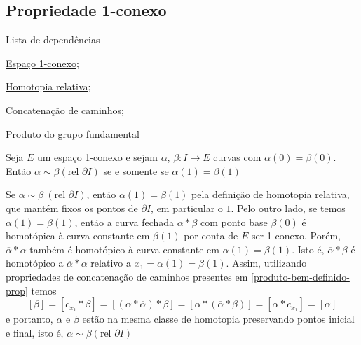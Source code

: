 \subsection{Propriedade 1-conexo} %
\label{1-conexo-prop}
\begin{titlemize}{Lista de dependências}
	\item \hyperref[espaço-1-conexo-def]{Espaço 1-conexo};\\ %
	\item \hyperref[homotopia-relativa-def]{Homotopia relativa};\\
        \item \hyperref[Produto-concatenacao-def]{Concatenação de caminhos};\\
        \item  \hyperref[produto-bem-definido-prop]{Produto do grupo fundamental}
\end{titlemize}




\begin{prop}%
	Seja $E$ um espaço 1-conexo e sejam $\alpha$, $\beta: I\rightarrow E$ curvas com $\alpha(0)=\beta(0)$. Então $\alpha \sim \beta (\text{rel }\partial I)$ se e somente se $\alpha(1)=\beta(1)$\\
\end{prop}
\begin{dem}
    Se $\alpha \sim \beta ~(\text{rel }\partial I)$, então $\alpha(1)=\beta(1)$ pela definição de homotopia relativa, que mantém fixos os pontos de $\partial I$, em particular o $1$.
    Pelo outro lado, se temos $\alpha(1)=\beta(1)$, então a curva fechada $\overline{\alpha}* \beta$ com ponto base $\beta(0)$ é homotópica à curva constante em $\beta(1)$ por conta de $E$ ser 1-conexo. Porém, $\overline{\alpha}*\alpha$ também é homotópico à curva constante em $\alpha(1)=\beta(1)$. Isto é, $\overline{\alpha}* \beta$ é homotópico a $\overline{\alpha}*\alpha$ relativo a $x_1=\alpha(1)=\beta(1)$. Assim, utilizando propriedades de concatenação de caminhos presentes em \ref{produto-bem-definido-prop} temos
   $$[\beta]=[c_{x_1}*\beta]=[(\alpha * \overline{\alpha}) *\beta]=[\alpha*(\overline{\alpha}*\beta)]=[\alpha * c_{x_1}]=[\alpha]$$
e portanto, $\alpha$ e $\beta$ estão na mesma classe de homotopia preservando pontos inicial e final, isto é, $\alpha \sim \beta (\text{rel }\partial I)$
\end{dem}

